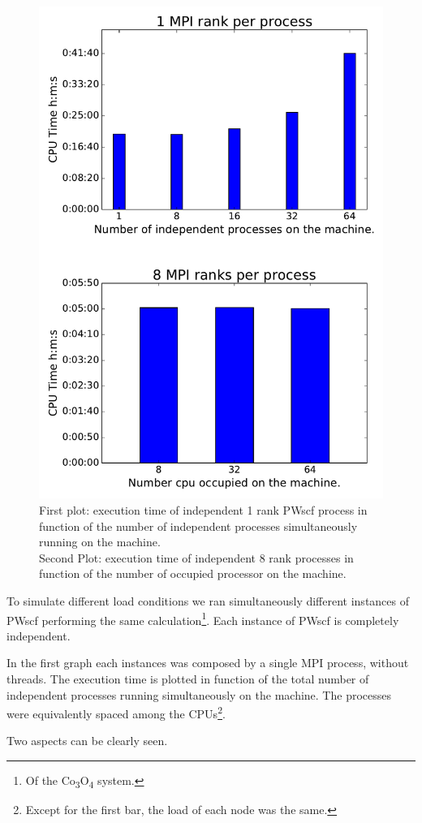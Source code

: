 \documentclass[a4paper,12pt]{article}
\newcommand\CO{Co\textsubscript{3}O\textsubscript{4} }
\begin{document}
\begin{figure}[hhh!]
\begin{center}
	\captionsetup{justification=centering}
	\includegraphics[width=0.7\linewidth]{sgiLoad.pdf}	
	\caption{First plot: execution time of independent 1 rank PWscf process in function of the number of independent processes simultaneously running on the machine. 
	\\Second Plot: execution time of independent 8 rank processes in function of the number of occupied processor on the machine.}
	\label{fig:sgiLoad}
\end{center}
\end{figure}

To simulate different load conditions we ran simultaneously different instances of PWscf performing the same calculation\footnote{Of the \CO system.}. Each instance of PWscf is completely independent.

In the first graph each instances was composed by a single MPI process, without threads. 
The execution time is plotted in function of the total number of independent processes running simultaneously on the machine.
The processes were equivalently spaced among the CPUs\footnote{Except for the first bar, the load of each node was the same.}.

Two aspects can be clearly seen.
\end{document}

